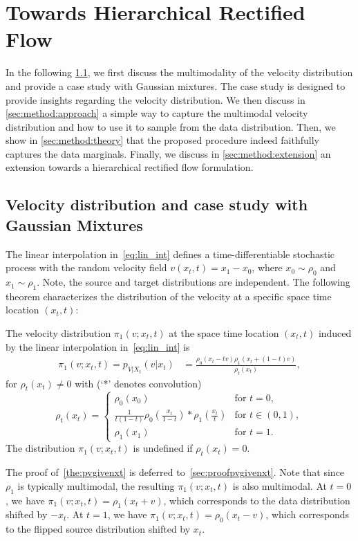 \section{Towards Hierarchical Rectified Flow}
\label{sec:method}

In the following \cref{sec:method:casestudy}, we first discuss the multimodality of the velocity distribution and provide a case study with Gaussian mixtures. The case study is designed to provide insights regarding the velocity distribution. We then discuss in \cref{sec:method:approach} a simple way to capture the multimodal velocity distribution and how to use it to sample from the data distribution. Then, we show in \cref{sec:method:theory} that the proposed procedure indeed faithfully captures the data marginals. Finally, we discuss in \cref{sec:method:extension} an extension towards a hierarchical rectified flow formulation.


\subsection{Velocity distribution and case study with Gaussian Mixtures}
\label{sec:method:casestudy}
The linear interpolation in~\cref{eq:lin_int} defines a time-differentiable stochastic process with the random velocity field $v(x_t, t) = x_1 - x_0$, where  $x_0 \sim \rho_0$ and $x_1 \sim \rho_1$. %
Note, the source and target distributions are independent.  The following theorem characterizes the distribution of the velocity at a specific space time location $(x_t,t)$:
\begin{theorem}
\label{the:pvgivenxt}
The velocity distribution $\pi_1(v; x_t, t)$ at the space time location $(x_t, t)$ induced by the linear interpolation in~\cref{eq:lin_int} is
\begin{align} 
\label{eq:vgxt}
\pi_1(v; x_t, t) = p_{V|X_t} (v | x_t)
& = \frac{\rho_0(x_t - tv) \rho_1(x_t + (1-t)v)}{\rho_t (x_t)},
\end{align}
for $\rho_t(x_t) \neq 0$ with (`*' denotes convolution)
\begin{equation}
\rho_t(x_t) =  
\begin{cases}
\rho_0 (x_0) &\text{for }t = 0, \\
\frac{1}{t(1-t)} \rho_0 \left( \frac{x_t}{1-t} \right) * \rho_1\left( \frac{x_t}{t}\right) & \text{for }t \in (0, 1),  \\
\rho_1 (x_1) &\text{for }t = 1.
\end{cases}
\end{equation}
The distribution $\pi_1(v; x_t, t)$ is undefined if $\rho_t(x_t) =0$. 
\end{theorem}
The proof of~\cref{the:pvgivenxt} is deferred to~\cref{sec:proofpvgivenxt}.
Note that since $\rho_1$ is typically multimodal, the resulting $\pi_1(v; x_t, t)$ is also multimodal. At $t = 0$, we have $\pi_1(v; x_t, t) = \rho_1(x_t + v)$, which corresponds to the data distribution shifted by $-x_t$. At $t = 1$, we have $ \pi_1(v; x_t, t) = \rho_0(x_t - v)$, which corresponds to the flipped source distribution shifted by $x_t$. 

